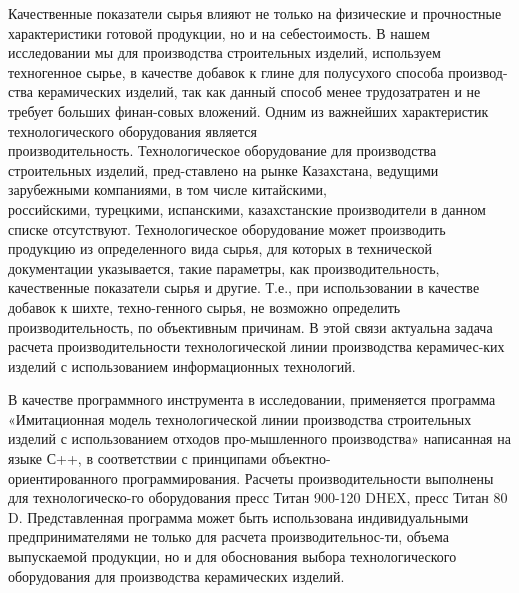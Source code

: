 Качественные показатели сырья влияют не только на физические и
прочностные характеристики готовой продукции, но и на себестоимость. В
нашем исследовании мы для производства строительных изделий, используем
техногенное сырье, в качестве добавок к глине для полусухого способа
производ-ства керамических изделий, так как данный способ менее
трудозатратен и не требует больших финан-совых вложений. Одним из
важнейших характеристик технологического оборудования является
\\производительность. Технологическое оборудование для производства
строительных изделий, пред-ставлено на рынке Казахстана, ведущими
зарубежными компаниями, в том числе китайскими, \\российскими, турецкими,
испанскими, казахстанские производители в данном списке отсутствуют.
Технологическое оборудование может производить продукцию из
определенного вида сырья, для которых в технической документации
указывается, такие параметры, как производительность, \\качественные
показатели сырья и другие. Т.е., при использовании в качестве добавок к
шихте, техно-генного сырья, не возможно определить производительность, по
объективным причинам. В этой связи актуальна задача расчета
производительности технологической линии производства керамичес-ких
изделий с использованием информационных технологий.

В качестве программного инструмента в исследовании, применяется
программа «Имитационная модель технологической линии производства
строительных изделий с использованием отходов про-мышленного
производства» написанная на языке С++, в соответствии с принципами
объектно-\\ориентированного программирования. Расчеты производительности
выполнены для технологическо-го оборудования пресс Титан 900-120 DHEX,
пресс Титан 80 D. Представленная программа может быть использована
индивидуальными предпринимателями не только для расчета
производительнос-ти, объема выпускаемой продукции, но и для обоснования
выбора технологического оборудования для производства керамических
изделий.

